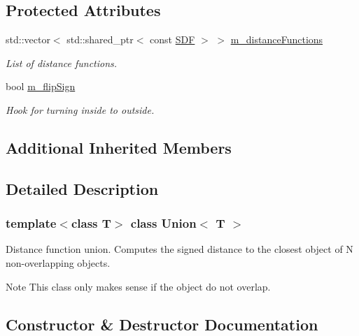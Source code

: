 \subsection*{Protected Attributes}
\begin{DoxyCompactItemize}
\item 
\mbox{\label{classUnion_a5d2f543272ab5fe25f6f5945ad1ef27f}} 
std\+::vector$<$ std\+::shared\+\_\+ptr$<$ const \hyperlink{classUnion_a9e9d1d95ae54fa471c6f29e778239021}{S\+DF} $>$ $>$ \hyperlink{classUnion_a5d2f543272ab5fe25f6f5945ad1ef27f}{m\+\_\+distance\+Functions}
\begin{DoxyCompactList}\small\item\em List of distance functions. \end{DoxyCompactList}\item 
\mbox{\label{classUnion_a53b9705419030572836a540e7fa3752f}} 
bool \hyperlink{classUnion_a53b9705419030572836a540e7fa3752f}{m\+\_\+flip\+Sign}
\begin{DoxyCompactList}\small\item\em Hook for turning inside to outside. \end{DoxyCompactList}\end{DoxyCompactItemize}
\subsection*{Additional Inherited Members}


\subsection{Detailed Description}
\subsubsection*{template$<$class T$>$\newline
class Union$<$ T $>$}

Distance function union. Computes the signed distance to the closest object of N non-\/overlapping objects. 

\begin{DoxyNote}{Note}
This class only makes sense if the object do not overlap. 
\end{DoxyNote}


\subsection{Constructor \& Destructor Documentation}
\mbox{\label{classUnion_a7f1a9e850f8965dc35e221b23a55e451}} 
